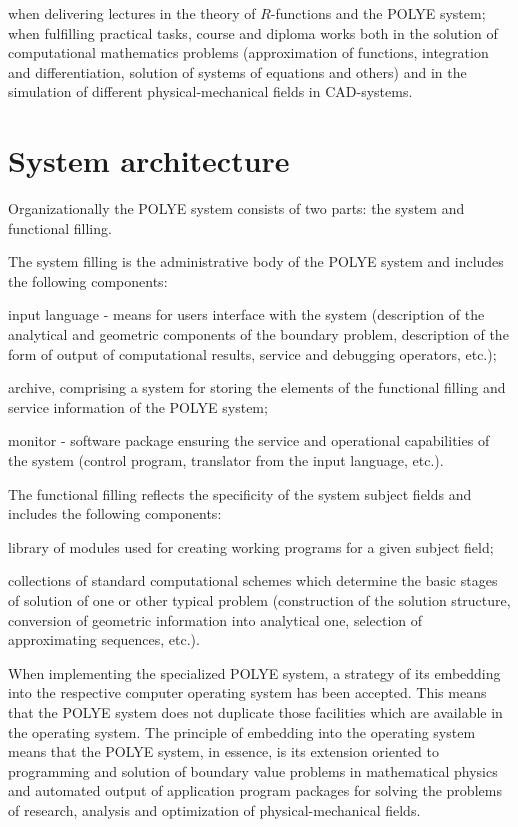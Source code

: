 when delivering lectures in the theory of $R$-functions and the POLYE
system; when fulfilling practical tasks, course and diploma works both in
the solution of computational mathematics problems (approximation of
functions, integration and differentiation, solution of systems of equations
and others) and in the simulation of different physical-mechanical fields in
CAD-systems.

\section{ System architecture}

Organizationally the POLYE system consists of two parts: the system and
functional filling.

The system filling is the administrative body of the POLYE system and
includes the following components:

input language - means for users interface with the system (description of
the analytical and geometric components of the boundary problem, description
of the form of output of computational results, service and debugging
operators, etc.);

archive, comprising a system for storing the elements of the functional
filling and service information of the POLYE system;

monitor - software package ensuring the service and operational capabilities
of the system (control program, translator from the input language, etc.).

The functional filling reflects the specificity of the system subject fields
and includes the following components:

library of modules used for creating working programs for a given subject
field;

collections of standard computational schemes which determine the basic
stages of solution of one or other typical problem (construction of the
solution structure, conversion of geometric information into analytical one,
selection of approximating sequences, etc.).

When implementing the specialized POLYE system, a strategy of its embedding
into the respective computer operating system has been accepted. This means
that the POLYE system does not duplicate those facilities which are
available in the operating system. The principle of embedding into the
operating system means that the POLYE system, in essence, is its extension
oriented to programming and solution of boundary value problems in
mathematical physics and automated output of application program packages
for solving the problems of research, analysis and optimization of
physical-mechanical fields.

